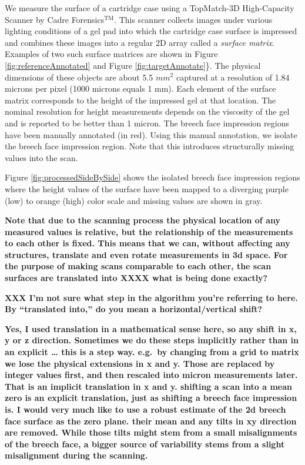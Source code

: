\documentclass[11pt,]{isuthesis}
\begin{document}
We measure the surface of a cartridge case using a TopMatch-3D High-Capacity Scanner by Cadre Forensics\(^{\text{TM}}\).
This scanner collects images under various lighting conditions of a gel pad into which the cartridge case surface is impressed and combines these images into a regular 2D array called a \emph{surface matrix}. Examples of two such surface matrices are shown in Figure \ref{fig:referenceAnnotated} and Figure \ref{fig:targetAnnotate}\}.
The physical dimensions of these objects are about 5.5 \(mm^2\) captured at a resolution of 1.84 microns per pixel (1000 microns equals 1 mm).
Each element of the surface matrix corresponds to the height of the impressed gel at that location.
The nominal resolution for height measurements depends on the viscosity of the gel and is reported to be better than 1 micron.
The breech face impression regions have been manually annotated (in red).
Using this manual annotation, we isolate the breech face impression region.
Note that this introduces structurally missing values into the scan.

Figure \ref{fig:processedSideBySide} shows the isolated breech face impression regions where the height values of the surface have been mapped to a diverging purple (low) to orange (high) color scale and missing values are shown in gray.

\textbf{Note that due to the scanning process the physical location of any measured values is relative, but the relationship of the measurements to each other is fixed. This means that we can, without affecting any structures, translate and even rotate measurements in 3d space. For the purpose of making scans comparable to each other, the scan surfaces are translated into XXXX what is being done exactly?}

\textbf{XXX I'm not sure what step in the algorithm you're referring to here. By ``translated into,'' do you mean a horizontal/vertical shift? }

\textbf{Yes, I used translation in a mathematical sense here, so any shift in x, y or z direction. Sometimes we do these steps implicitly rather than in an explicit \ldots{} this is a step way. e.g.~by changing from a grid to matrix we lose the physical extensions in x and y. Those are replaced by integer values first, and then rescaled into micron measurements later. That is an implicit translation in x and y. shifting a scan into a mean zero is an explicit translation, just as shifting a breech face impression is. I would very much like to use a robust estimate of the 2d breech face surface as the zero plane. their mean and any tilts in xy direction are removed. While those tilts might stem from a small misalignments of the breech face, a bigger source of variability stems from a slight misalignment during the scanning. }
\end{document}
